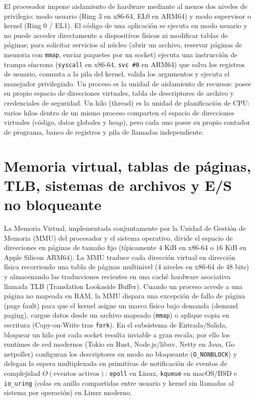 \documentclass{book}
\begin{document}
El procesador impone aislamiento de hardware mediante al menos dos niveles de privilegio: modo usuario (Ring 3 en x86-64, EL0 en ARM64) y modo supervisor o kernel (Ring 0 / EL1). El código de una aplicación se ejecuta en modo usuario y no puede acceder directamente a dispositivos físicos ni modificar tablas de páginas; para solicitar servicios al núcleo (abrir un archivo, reservar páginas de memoria con \texttt{mmap}, enviar paquetes por un socket) ejecuta una instrucción de trampa síncrona (\texttt{syscall} en x86-64, \texttt{svc \#0} en ARM64) que salva los registros de usuario, conmuta a la pila del kernel, valida los argumentos y ejecuta el manejador privilegiado.
Un proceso es la unidad de aislamiento de recursos: posee su propio espacio de direcciones virtuales, tabla de descriptores de archivo y credenciales de seguridad. Un hilo (thread) es la unidad de planificación de CPU: varios hilos dentro de un mismo proceso comparten el espacio de direcciones virtuales (código, datos globales y heap), pero cada uno posee su propio contador de programa, banco de registros y pila de llamadas independiente.

\section{Memoria virtual, tablas de páginas, TLB, sistemas de archivos y E/S no bloqueante}

La Memoria Virtual, implementada conjuntamente por la Unidad de Gestión de Memoria (MMU) del procesador y el sistema operativo, divide el espacio de direcciones en páginas de tamaño fijo (típicamente \(4\text{ KiB}\) en x86-64 o \(16\text{ KiB}\) en Apple Silicon ARM64). La MMU traduce cada dirección virtual en dirección física recorriendo una tabla de páginas multinivel (4 niveles en x86-64 de 48 bits) y almacenando las traducciones recientes en una caché hardware asociativa llamada TLB (Translation Lookaside Buffer). Cuando un proceso accede a una página no mapeada en RAM, la MMU dispara una excepción de fallo de página (page fault) para que el kernel asigne un marco físico bajo demanda (demand paging), cargue datos desde un archivo mapeado (\texttt{mmap}) o aplique copia en escritura (Copy-on-Write tras \texttt{fork}).
En el subsistema de Entrada/Salida, bloquear un hilo por cada socket resulta inviable a gran escala; por ello los runtimes de red modernos (Tokio en Rust, Node.js/libuv, Netty en Java, Go netpoller) configuran los descriptores en modo no bloqueante (\texttt{O\_NONBLOCK}) y delegan la espera multiplexada en primitivas de notificación de eventos de complejidad \(O(\text{eventos activos})\): \texttt{epoll} en Linux, \texttt{kqueue} en macOS/BSD e \texttt{io\_uring} (colas en anillo compartidas entre usuario y kernel sin llamadas al sistema por operación) en Linux moderno.
\end{document}

